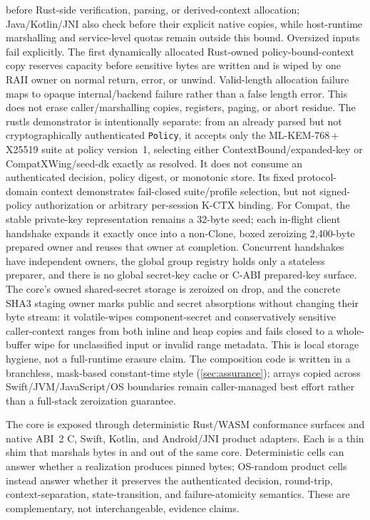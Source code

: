 \documentclass[journal]{IEEEtran}
\newcommand{\code}[1]{\texttt{\small #1}}
\begin{document}
before Rust-side verification, parsing, or derived-context allocation; Java/Kotlin/JNI also check
before their explicit native copies, while host-runtime marshalling and service-level quotas remain
outside this bound. Oversized inputs fail explicitly. The first dynamically allocated Rust-owned
policy-bound-context copy reserves capacity before sensitive bytes are written and is wiped by one
RAII owner on normal return, error, or unwind. Valid-length allocation failure maps to opaque
internal/backend failure rather than a false length error. This does not erase caller/marshalling
copies, registers, paging, or abort residue. The rustls demonstrator is intentionally
separate: from an already parsed but not cryptographically authenticated \code{Policy}, it accepts
only the ML-KEM-768\,+\,X25519 suite at policy version~1, selecting either
ContextBound/expanded-key or CompatXWing/seed-dk exactly as resolved. It does not consume an
authenticated decision, policy digest, or monotonic store. Its fixed protocol-domain context
demonstrates fail-closed suite/profile selection, but not signed-policy authorization or arbitrary
per-session K-CTX binding. For Compat, the stable private-key representation remains a 32-byte
seed; each in-flight client handshake expands it exactly once into a non-Clone, boxed zeroizing
2,400-byte prepared owner and reuses that owner at completion. Concurrent handshakes have
independent owners, the global group registry holds only a stateless preparer, and there is no
global secret-key cache or C-ABI prepared-key surface. The core's owned shared-secret storage is zeroized on drop, and the
concrete SHA3 staging owner marks public and secret absorptions without changing their byte stream:
it volatile-wipes component-secret and conservatively sensitive caller-context ranges from both
inline and heap copies and fails closed to a whole-buffer wipe for unclassified input or invalid
range metadata. This is local storage hygiene,
not a full-runtime erasure claim. The
composition code is written in a branchless, mask-based constant-time style
(\cref{sec:assurance}); arrays copied across Swift/JVM/JavaScript/OS boundaries remain
caller-managed best effort rather than a full-stack zeroization guarantee.

The core is exposed through deterministic Rust/WASM conformance surfaces and native ABI~2 C,
Swift, Kotlin, and Android/JNI product adapters. Each is a thin shim that marshals bytes in and out
of the same core. Deterministic cells can answer whether a realization produces pinned bytes;
OS-random product cells instead answer whether it preserves the authenticated decision, round-trip,
context-separation, state-transition, and failure-atomicity semantics. These are complementary,
not interchangeable, evidence claims.
\end{document}
